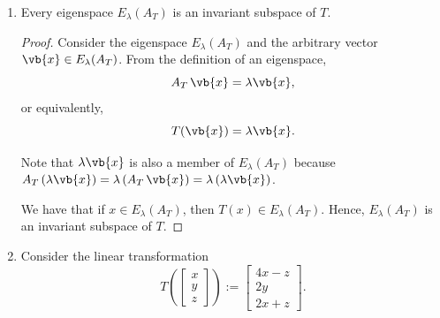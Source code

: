 \begin{enumerate}
        \bigskip

        \begin{enumerate}

            \item
                \begin{proposition} \label{prop:4a}
                    Every eigenspace $E_{\lambda}(A_T)$ is an invariant subspace of $T$.
                \end{proposition}

                \smallskip

                \begin{proof}
                    Consider the eigenspace $E_\lambda(A_T)$ and the arbitrary vector $\vb{x} \in E_\lambda(A_T)$.
                    From the definition of an eigenspace,
                    \[ A_T \, \vb{x} = \lambda \vb{x}, \]
                    or equivalently,
                    \[ T(\vb{x}) = \lambda \vb{x}. \]

                    Note that $\lambda \vb{x}$ is also a member of $E_\lambda(A_T)$ because $A_T \, (\lambda \vb{x}) = \lambda \, (A_T \, \vb{x}) = \lambda \, (\lambda \vb{x})$.

                    We have that if $x \in E_\lambda(A_T)$, then $T(x) \in E_\lambda(A_T)$.
                    Hence, $E_\lambda(A_T)$ is an invariant subspace of $T$.
                \end{proof}

                \bigskip

            \item Consider the linear transformation
                \[
                    T\left(
                        \begin{bmatrix}
                            x \\ y \\ z
                        \end{bmatrix}
                    \right) :=
                    \begin{bmatrix}
                        4 x - z \\ 2 y \\ 2x + z
                    \end{bmatrix}.
                \]

                \medskip


\end{enumerate}
\end{enumerate}
